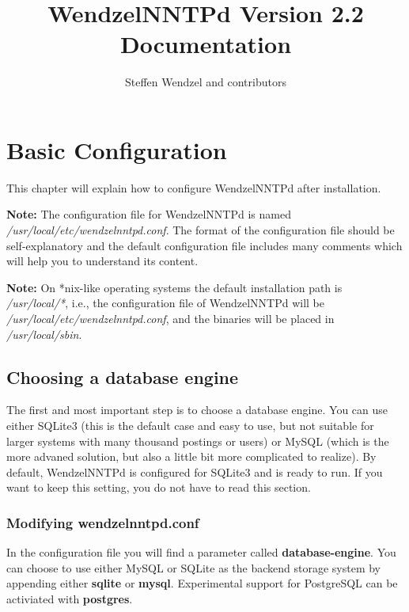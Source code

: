 \documentclass[12pt,fleqn,leqno]{scrbook}
\title{WendzelNNTPd Version 2.2 Documentation}
\author{Steffen Wendzel and contributors}
\begin{document}
\maketitle

\tableofcontents

\hypertarget{basic-configuration}{%
\section{Basic Configuration}\label{basic-configuration}}

\protect\hypertarget{Ch:Config}{}{}

This chapter will explain how to configure WendzelNNTPd after
installation.

\textbf{Note:} The configuration file for WendzelNNTPd is named
\emph{/usr/local/etc/wendzelnntpd.conf}. The format of the configuration
file should be self-explanatory and the default configuration file
includes many comments which will help you to understand its content.

\textbf{Note:} On *nix-like operating systems the default installation
path is \emph{/usr/local/*}, i.e., the configuration file of
WendzelNNTPd will be \emph{/usr/local/etc/wendzelnntpd.conf}, and the
binaries will be placed in \emph{/usr/local/sbin}.

\hypertarget{choosing-a-database-engine}{%
\subsection{Choosing a database
engine}\label{choosing-a-database-engine}}

The first and most important step is to choose a database engine. You
can use either SQLite3 (this is the default case and easy to use, but
not suitable for larger systems with many thousand postings or users) or
MySQL (which is the more advaned solution, but also a little bit more
complicated to realize). By default, WendzelNNTPd is configured for
SQLite3 and is ready to run. If you want to keep this setting, you do
not have to read this section.

\hypertarget{modifying-wendzelnntpd.conf}{%
\subsubsection{Modifying
wendzelnntpd.conf}\label{modifying-wendzelnntpd.conf}}

In the configuration file you will find a parameter called
\textbf{database-engine}. You can choose to use either MySQL or SQLite
as the backend storage system by appending either \textbf{sqlite} or
\textbf{mysql}. Experimental support for PostgreSQL can be activiated
with \textbf{postgres}.
\end{document}
